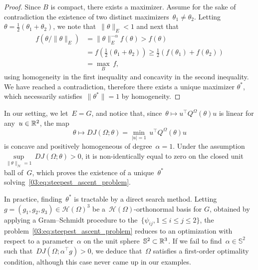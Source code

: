 \begin{proof}
    Since $B$ is compact, there exists a maximizer. Assume for the sake of contradiction the existence of two distinct maximizers~$\theta_1\neq \theta_2$.
    Letting~$\theta = \frac12(\theta_1+\theta_2)$, we note that~$\|\theta\|_E<1$ and next that
    \begin{equation}
        \begin{aligned}
        f(\theta/\|\theta\|_{E})&=\|\theta\|^{-\alpha}_{E}f(\theta)>f(\theta)\\
        &=f\left(\frac12(\theta_1+\theta_2)\right)\geq \frac12\left(f(\theta_1)+f(\theta_2)\right)\\
        &=\max_B\,f,
        \end{aligned}
    \end{equation}
    using homogeneity in the first inequality and concavity in the second inequality. We have reached a contradiction, therefore there exists a unique maximizer $\theta^*$, which necessarily satisfies~$\|\theta^*\|=1$ by homogeneity.
\end{proof}

In our setting, we let~$E=G$, and notice that, since~$\theta\mapsto u^\top Q^\Omega(\theta)u$ is linear for any~$u\in \mathbb{R}^2$, the map
\begin{equation}
    \theta\mapsto DJ(\Omega;\theta)=\underset{|u|=1}{\min}\,u^\top Q^{\Omega}(\theta)u
\end{equation}
is concave and positively homogeneous of degree~$\alpha=1$. Under the assumption~$\underset{\|\theta\|_{\mathcal H}=1}{\sup}\,DJ(\Omega;\theta)>0$, it is non-identically equal to zero on the closed unit ball of~$G$, which proves the existence of a unique~$\theta^*$ solving~\eqref{03:eq:steepest_ascent_problem}.

In practice, finding~$\theta^*$ is tractable by a direct search method. Letting~$g=(g_1,g_2,g_3)\in \mathcal H(\Omega)^3$ be a~$\mathcal H(\Omega)$-orthonormal basis for $G$, obtained by applying a Gram--Schmidt procedure to the~$\{\psi_{ij},1\leq i\leq j\leq 2\}$, the problem~\eqref{03:eq:steepest_ascent_problem} reduces to an optimization with respect to a parameter~$\alpha$ on the unit sphere~$\mathbb S^2\subset\mathbb{R}^3$. 
If we fail to find~$\alpha\in\mathbb S^2$ such that~$DJ(\Omega;\alpha^\top g)>0$, we deduce that~$\Omega$ satisfies a first-order optimality condition, although this case never came up in our examples.

